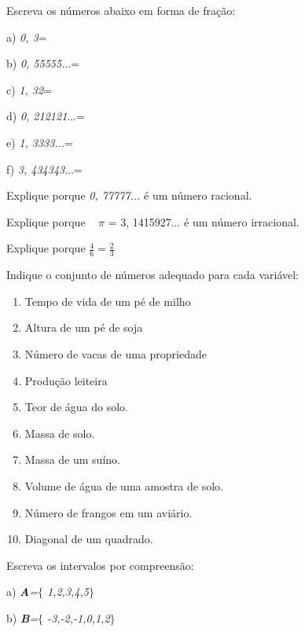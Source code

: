 \begin{exercicios}
\exitem{} Escreva os números abaixo em forma de fração:
\begin{multicols}{3}
	
a) \textit{0, 3}=

b) \textit{0, 55555.}..=

c) \textit{1, 32}= 

d) \textit{0, 212121}...=

e) \textit{1, 3333..}.=

f) \textit{3, 434343}...=
\end{multicols}

	\exitem{}  Explique porque \textit{0, 77777...} é um número racional.

	\exitem{}  Explique porque ~ $ \pi $  = 3, 1415927... é um número irracional.

	\exitem{}  Explique porque  \( \frac{4}{6}=\frac{2}{3} \)  ~~ 

	\exitem{}  Indique o conjunto de números adequado para cada variável:
	\begin{enumerate}[label=\alph*)]
    \item Tempo de vida de um pé de milho

    \item Altura de um pé de soja

    \item Número de vacas de uma propriedade

    \item Produção leiteira

    \item Teor de água do solo.

    \item Massa de solo.

    \item Massa de um suíno.

    \item Volume de água de uma amostra de solo.

    \item Número de frangos em um aviário.

    \item Diagonal de um quadrado.
\end{enumerate}
	\exitem{} Escreva os intervalos por compreensão:
	\begin{multicols}{2}
	
		a) \textbf{\textit{A}}\textit{=$ \{ $ 1,2,3,4,5$ \} $ }
		
		b) \textbf{\textit{B}}\textit{=$ \{ $ -3,-2,-1,0,1,2$ \} $ }


\end{multicols}
\end{exercicios}
